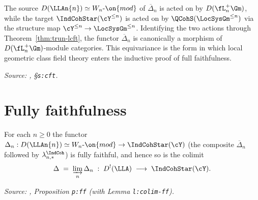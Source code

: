 \begin{proposition}
  \label{prop:lcft-compat}
  The source $D(\LLAn{n}) \simeq W_n\text{-}\on{mod}$ of $\overline{\Delta}_n$
  is acted on by $D(\fL^+_n\Gm)$, while the target $\IndCohStar(\cY^{\leq n})$
  is acted on by $\QCohS(\LocSysGm^{\leq n})$ via the structure map
  $\cY^{\leq n} \to \LocSysGm^{\leq n}$. Identifying the two actions through
  Theorem~\ref{thm:trun-lcft}, the functor $\overline{\Delta}_n$ is
  canonically a morphism of $D(\fL^+_n\Gm)$-module categories. This
  equivariance is the form in which local geometric class field theory enters
  the inductive proof of full faithfulness.

  \textit{Source: \cite{hilburn-raskin}, \S\texttt{s:cft}.}
\end{proposition}

\section{Fully faithfulness}

\begin{theorem}
  \label{thm:fully-faithful}
  For each $n \geq 0$ the functor
  $\Delta_n : D(\LLAn{n}) \simeq W_n\text{-}\on{mod} \to \IndCohStar(\cY)$
  (the composite $\overline{\Delta}_n$ followed by $\lambda_{n,*}^{\IndCoh}$)
  is fully faithful, and hence so is the colimit
  \[
    \Delta \;=\; \varinjlim_n \Delta_n \;:\; D^!(\LLA) \;\longrightarrow\;
    \IndCohStar(\cY).
  \]

  \textit{Source: \cite{hilburn-raskin}, Proposition \texttt{p:ff} (with Lemma \texttt{l:colim-ff}).}
\end{theorem}

